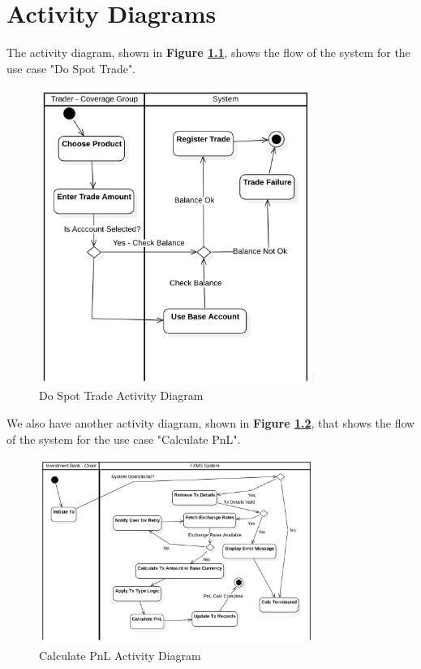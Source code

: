 \documentclass[a4paper]{report}
\begin{document}
\chapter{Activity Diagrams}

The activity diagram, shown in \textbf{Figure \ref{fig:do-spot-trade-activity-diagram}}, shows the flow of the system for the use case "Do Spot Trade".

\begin{figure}[h!]
    \centering
    \includegraphics[width=0.8\textwidth]{images/do-spot-trade-activity-diagram.png}
    \caption{Do Spot Trade Activity Diagram}
    \label{fig:do-spot-trade-activity-diagram}
\end{figure}

We also have another activity diagram, shown in \textbf{Figure \ref{fig:calc-pnl-activity-diagram}}, that shows the flow of the system for the use case "Calculate PnL".

\begin{figure}[h!]
    \centering
    \includegraphics[width=0.8\textwidth]{images/calc-pnl-activity-diagram.png}
    \caption{Calculate PnL Activity Diagram}
    \label{fig:calc-pnl-activity-diagram}
\end{figure}
\end{document}
